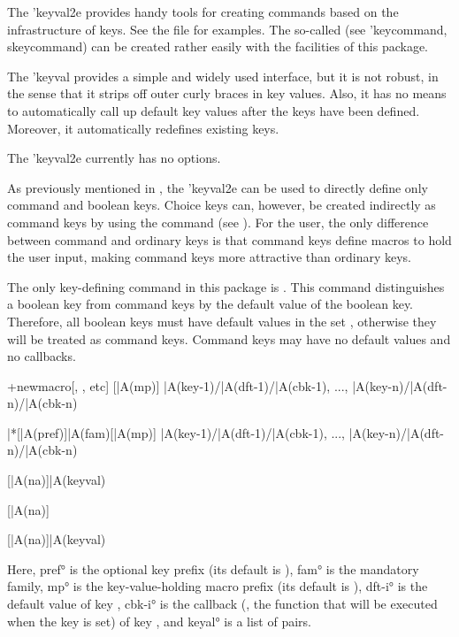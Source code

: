 \documentclass[
  use-a4-paper,
  use-10pt-font,
  final-version,
  use-UK-English,
  fancy-section-headings,
  frame-section-numbers,
  para-abstract-style,
  input-config-file,
  no-hyperref-messages
]{amltxdoc}
\begin{document}
The \pkg'{keyval2e} provides handy tools for creating commands based on the infrastructure of keys. See the file  for examples. The so-called  (see \pkg'{keycommand, skeycommand}) can be created rather easily with the facilities of this package.

The \pkg'{keyval} provides a simple and widely used interface, but it is not robust, in the sense that it strips off outer curly braces in key values. Also, it has no means to automatically call up default key values after the keys have been defined. Moreover, it automatically redefines existing keys.



The \pkg'{keyval2e} currently has no options.



As previously mentioned in , the \pkg'{keyval2e} can be used to directly define only command and boolean keys. Choice keys can, however, be created indirectly as command keys by using the \fx{\kve@checkchoice} command (see ). For the user, the only difference between command and ordinary keys is that command keys define macros to hold the user input, making command keys more attractive than ordinary keys.

The only key-defining command in this package is \fx{\kve@definekeys}. This command distinguishes a boolean key from command keys by the default value of the boolean key. Therefore, all boolean keys must have default values in the set , otherwise they will be treated as command keys. Command keys may have no default values and no callbacks.

\start+{newmacro}[\kve@definekeys, \kve@setkeys, etc]
[|A(mp)]{%
  |A(key-1)/|A(dft-1)/|A(cbk-1),
  ...,
  |A(key-n)/|A(dft-n)/|A(cbk-n)
}

\kve@definekeys|*[|A(pref)]{|A(fam)}[|A(mp)]{%
  |A(key-1)/|A(dft-1)/|A(cbk-1),
  ...,
  |A(key-n)/|A(dft-n)/|A(cbk-n)
}

[|A(na)]{|A(keyval)}

[|A(na)]

[|A(na)]{|A(keyval)}
\fxim*{\kve@definekeys,\kve@setkeys,\kve@setdefaults,\kve@setafterdefaults}

Here, \ang{pref} is the optional key prefix (its default is ), \ang{fam} is the mandatory family, \ang{mp} is the key-value-holding macro prefix (its default is ), \ang{dft-i} is the default value of key , \ang{cbk-i} is the callback (\ie, the function that will be executed when the key is set) of key , and \ang{keyal} is a list of \keyval pairs.
\end{document}
